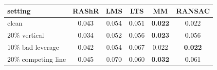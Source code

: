 \begin{tabular}{@{}lccccc@{}}
\toprule
setting & RAShR & LMS & LTS & MM & RANSAC \\
\midrule
clean & 0.043 & 0.054 & 0.051 & \textbf{0.022} & 0.022 \\
20\% vertical & 0.034 & 0.052 & 0.056 & \textbf{0.023} & 0.056 \\
10\% bad leverage & 0.042 & 0.054 & 0.067 & 0.022 & \textbf{0.022} \\
20\% competing line & 0.045 & 0.070 & 0.060 & \textbf{0.032} & 0.061 \\
\bottomrule
\end{tabular}
